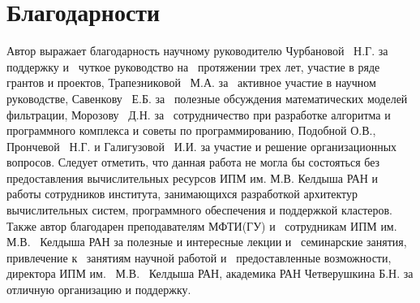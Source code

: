 \section*{Благодарности}

Автор выражает благодарность научному руководителю Чурбановой~ Н.Г.
за~ поддержку и~ чуткое руководство на~ протяжении трех лет,
участие в ряде грантов и проектов,
Трапезниковой~ М.А. за~ активное участие в научном руководстве,
Савенкову~ Е.Б. за~ полезные обсуждения математических моделей
фильтрации, Морозову~ Д.Н. за~ сотрудничество при разработке алгоритма
и программного комплекса и советы по программированию, Подобной О.В.,
Прончевой~ Н.Г. и Галигузовой~ И.И. за участие и решение организационных вопросов.
Следует отметить, что данная работа не могла бы состояться без предоставления
вычислительных ресурсов ИПМ им. М.В. Келдыша РАН и работы сотрудников
института, занимающихся разработкой архитектур вычислительных
систем, программного обеспечения и поддержкой кластеров.
Также автор благодарен преподавателям МФТИ(ГУ) и~
сотрудникам ИПМ им.~ М.В.~ Келдыша РАН за полезные и интересные лекции
и~ семинарские занятия, привлечение к~ занятиям научной работой и~
предоставленные возможности, директора ИПМ им.~ М.В.~ Келдыша РАН, академика РАН
Четверушкина Б.Н. за отличную организацию и поддержку.
